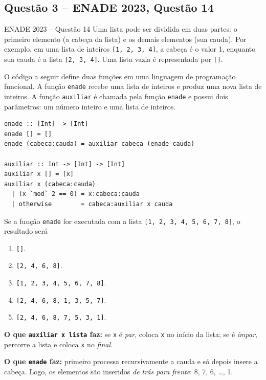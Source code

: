 \documentclass[11pt,a4paper]{article}
\newcommand{\solucao}{\par\medskip\noindent{\large\bfseries\color{verde}Solução}\par\smallskip}
\begin{document}
\subsection{Questão 3 -- ENADE 2023, Questão 14}
\begin{enunciado}{ENADE 2023 -- Questão 14}
Uma lista pode ser dividida em duas partes: o primeiro elemento (a cabeça da lista) e os demais
elementos (sua cauda). Por exemplo, em uma lista de inteiros \texttt{[1, 2, 3, 4]}, a cabeça é o
valor 1, enquanto sua cauda é a lista \texttt{[2, 3, 4]}. Uma lista vazia é representada por \texttt{[]}.

O código a seguir define duas funções em uma linguagem de programação funcional. A função
\texttt{enade} recebe uma lista de inteiros e produz uma nova lista de inteiros. A função
\texttt{auxiliar} é chamada pela função \texttt{enade} e possui dois parâmetros: um número inteiro
e uma lista de inteiros.
\begin{lstlisting}[language=Haskell2,numbers=none]
enade :: [Int] -> [Int]
enade [] = []
enade (cabeca:cauda) = auxiliar cabeca (enade cauda)

auxiliar :: Int -> [Int] -> [Int]
auxiliar x [] = [x]
auxiliar x (cabeca:cauda)
  | (x `mod` 2 == 0) = x:cabeca:cauda
  | otherwise        = cabeca:auxiliar x cauda
\end{lstlisting}
Se a função \texttt{enade} for executada com a lista \texttt{[1, 2, 3, 4, 5, 6, 7, 8]}, o resultado será
\begin{enumerate}[label=\Alph*)]
  \item \texttt{[]}.
  \item \texttt{[2, 4, 6, 8]}.
  \item \texttt{[1, 2, 3, 4, 5, 6, 7, 8]}.
  \item \texttt{[2, 4, 6, 8, 1, 3, 5, 7]}.
  \item \texttt{[2, 4, 6, 8, 7, 5, 3, 1]}.
\end{enumerate}
\end{enunciado}

\solucao
\textbf{O que \texttt{auxiliar x lista} faz:} se \texttt{x} é \emph{par}, coloca \texttt{x} no início
da lista; se é \emph{ímpar}, percorre a lista e coloca \texttt{x} no \emph{final}.

\textbf{O que \texttt{enade} faz:} primeiro processa recursivamente a cauda e só depois insere a cabeça.
Logo, os elementos são inseridos \emph{de trás para frente}: 8, 7, 6, \dots, 1.
\end{document}
